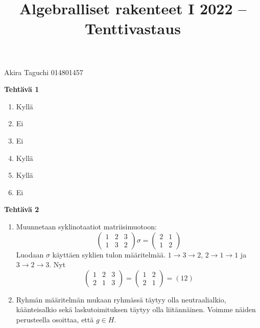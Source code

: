 \documentclass[11pt,a4paper]{amsart}
\title{Algebralliset rakenteet I 2022 -- Tenttivastaus}
\newcommand{\1}{\mathbf{1}}
\begin{document}
\maketitle

Akira Taguchi 014801457

\medskip

\begin{Solution}
  \textbf{Tehtävä 1}
  \begin{enumerate}
    \item Kyllä
    \item Ei
    \item Ei
    \item Kyllä
    \item Kyllä
    \item Ei
  \end{enumerate}
\end{Solution}

\begin{Solution}
  \textbf{Tehtävä 2}
  \begin{enumerate}
    \item Muunnetaan syklinotaatiot matriisimuotoon:
          \[
            \begin{pmatrix}
              1 & 2 & 3 \\
              1 & 3 & 2
            \end{pmatrix} \sigma =
            \begin{pmatrix}
              2 & 1 \\
              1 & 2
            \end{pmatrix}
          \]
          Luodaan $\sigma$ käyttäen syklien tulon määritelmää. $1\rightarrow 3 \rightarrow 2$, $2\rightarrow 1 \rightarrow 1$ ja $3\rightarrow 2\rightarrow 3$. Nyt
          \[
            \begin{pmatrix}
              1 & 2 & 3 \\
              2 & 1 & 3
            \end{pmatrix}=
            \begin{pmatrix}
              1 & 2 \\
              2 & 1
            \end{pmatrix}=(12)
          \]
    \item Ryhmän määritelmän mukaan ryhmässä täytyy olla neutraalialkio, käänteisalkio sekä laskutoimituksen täytyy olla liitännäinen. Voimme näiden perusteella osoittaa, että $g\in H$.
  \end{enumerate}
\end{Solution}
\end{document}
